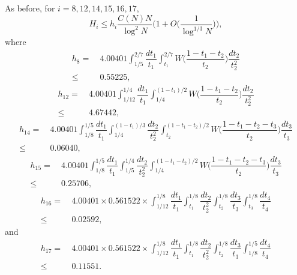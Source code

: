 \documentclass[12pt, a4paper]{amsart}
\def\le{\leqslant}
\theoremstyle{plain}
\theoremstyle{remark}
\numberwithin{equation}{section}
\begin{document}
As before, for \(i = 8, 12, 14, 15, 16, 17\),
\begin{equation}\label{H8-17}
H_i \le h_i\dfrac{C(N)N}{\log^2 N}\bigg(1+O\bigg(\dfrac{1}{\log^{1/3}N}\bigg)\bigg),
\end{equation}
where
\begin{equation}\label{h8}
\begin{aligned}
h_{8}=\ &4.00401\int_{1/5}^{2/7}\dfrac{dt_1}{t_1}\int_{t_1}^{2/7}W\bigg(\dfrac{1-t_1-t_2}{t_2}\bigg)\dfrac{dt_2}{t_2^2}\\
\le\ & 0.55225,
\end{aligned}
\end{equation}
\begin{equation}\label{h12}
\begin{aligned}
h_{12}=\ &4.00401\int_{1/12}^{1/4}\dfrac{dt_1}{t_1}\int_{1/4}^{(1-t_1)/2}W\bigg(\dfrac{1-t_1-t_2}{t_2}\bigg)\dfrac{dt_2}{t_2^2}\\
\le \ & 4.67442,
\end{aligned}
\end{equation}
\begin{equation}\label{h14}
\begin{aligned}
h_{14}=\ &4.00401\int_{1/8}^{1/5}\dfrac{dt_1}{t_1}\int_{1/4}^{(1-t_1)/3}\dfrac{dt_2}{t_2^2}\int_{t_2}^{(1-t_1-t_2)/2}W\bigg(\dfrac{1-t_1-t_2-t_3}{t_2}\bigg)\dfrac{dt_3}{t_3}\\
\le \ &0.06040,
\end{aligned}
\end{equation}
\begin{equation}\label{h15}
\begin{aligned}
h_{15}=\ &4.00401\int_{1/8}^{1/5}\dfrac{dt_1}{t_1}\int_{1/5}^{1/4}\dfrac{dt_2}{t_2^2}\int_{1/4}^{(1-t_1-t_2)/2}W\bigg(\dfrac{1-t_1-t_2-t_3}{t_2}\bigg)\dfrac{dt_3}{t_3}\\
\le \ &0.25706,
\end{aligned}
\end{equation}
\begin{equation}\label{h16}
\begin{aligned}
h_{16}=\ &4.00401\times 0.561522\times\int_{1/12}^{1/8}\dfrac{dt_1}{t_1}\int_{t_1}^{1/8}\dfrac{dt_2}{t_2^2}\int_{t_2}^{1/8}\dfrac{dt_3}{t_3}\int_{t_3}^{1/8}\dfrac{dt_4}{t_4}\\
\le \ &0.02592,
\end{aligned}
\end{equation}
and 
\begin{equation}\label{h17}
\begin{aligned}
h_{17}=\ &4.00401\times 0.561522\times\int_{1/12}^{1/8}\dfrac{dt_1}{t_1}\int_{t_1}^{1/8}\dfrac{dt_2}{t_2^2}\int_{t_2}^{1/8}\dfrac{dt_3}{t_3}\int_{1/8}^{1/5}\dfrac{dt_4}{t_4}\\
\le\ & 0.11551.
\end{aligned}
\end{equation}
\end{document}
